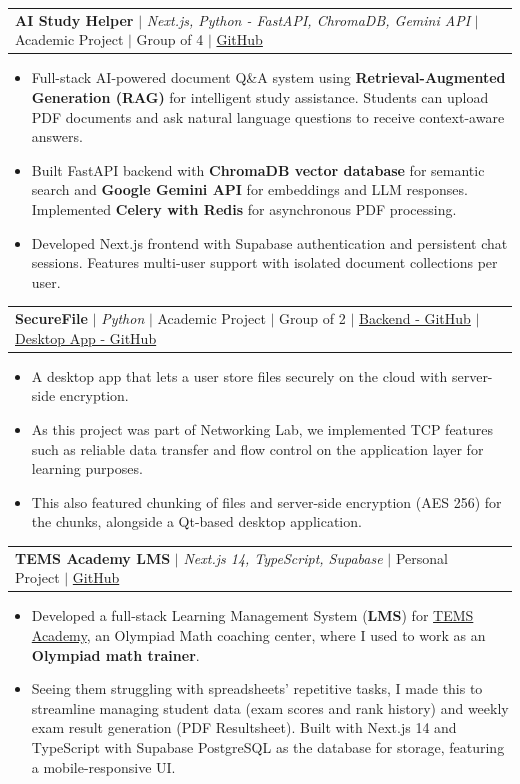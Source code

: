 \documentclass[a4paper,11pt]{article}
\makeatletter
\newcommand{\resumeItem}[1]{
  \item\small{\justifying #1 \vspace{-2pt}}
}
\newcommand{\resumeProjectHeading}[2]{
  \vspace{-2pt}\item
    \begin{tabular*}{0.97\textwidth}{l@{\extracolsep{\fill}}r}
      \small#1 & #2 \\
    \end{tabular*}\vspace{-7pt}
}
\newcommand{\resumeItemListStart}{\begin{itemize}}
\newcommand{\resumeItemListEnd}{\end{itemize}\vspace{-5pt}}
\makeatother
\begin{document}
\resumeProjectHeading
  {\textbf{AI Study Helper} $|$ \emph{Next.js, Python - FastAPI, ChromaDB, Gemini API} $|$ Academic Project $|$ Group of 4 $|$ \href{https://github.com/Adha-KG/}{\color{blue}GitHub}}{}
  \begin{justify}
  \resumeItemListStart
    \resumeItem{Full-stack AI-powered document Q\&A system using \textbf{Retrieval-Augmented Generation (RAG)} for intelligent study assistance. Students can upload PDF documents and ask natural language questions to receive context-aware answers.}
    \resumeItem{Built FastAPI backend with \textbf{ChromaDB vector database} for semantic search and \textbf{Google Gemini API} for embeddings and LLM responses. Implemented \textbf{Celery with Redis} for asynchronous PDF processing.}
    \resumeItem{Developed Next.js frontend with Supabase authentication and persistent chat sessions. Features multi-user support with isolated document collections per user.}
  \resumeItemListEnd
  \end{justify}

\resumeProjectHeading
  {\textbf{SecureFile} $|$ \emph{Python} $|$ Academic Project $|$ Group of 2 $|$ \href{https://github.com/mithunvoe/networking-project-backend}{Backend - GitHub} $|$ \href{https://github.com/ninadgns/networking-project-frontend}{Desktop App - GitHub} }{}
  \begin{justify}
  \resumeItemListStart
    \resumeItem{A desktop app that lets a user store files securely on the cloud with server-side encryption.}
    \resumeItem{As this project was part of Networking Lab, we implemented TCP features such as reliable data transfer and flow control on the application layer for learning purposes.}
    \resumeItem{This also featured chunking of files and server-side encryption (AES 256) for the chunks, alongside a Qt-based desktop application.}
  \resumeItemListEnd
  \end{justify}
  
\resumeProjectHeading
  {\textbf{TEMS Academy LMS} $|$ \emph{Next.js 14, TypeScript, Supabase} $|$ Personal Project $|$ \href{https://github.com/ninadgns/TEMS-LMS}{\color{blue}GitHub}}{}
  \begin{justify}
  \resumeItemListStart
    \resumeItem{Developed a full-stack Learning Management System (\textbf{LMS}) for \href{https://www.facebook.com/TEMS.MathAcademy}{TEMS Academy}, an Olympiad Math coaching center, where I used to work as an \textbf{Olympiad math trainer}.}
    \resumeItem{Seeing them struggling with spreadsheets' repetitive tasks, I made this to streamline managing student data (exam scores and rank history) and weekly exam result generation (PDF Resultsheet). Built with Next.js 14 and TypeScript with Supabase PostgreSQL as the database for storage, featuring a mobile-responsive UI.}
  \resumeItemListEnd
  \end{justify}
\end{document}
